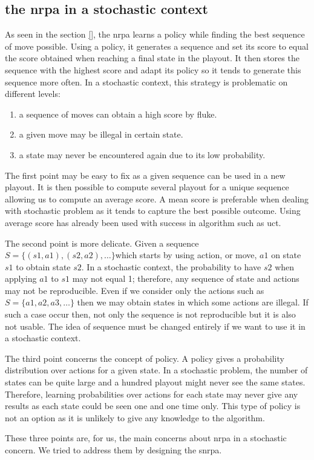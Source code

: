 \subsection{the \gls{nrpa} in a stochastic context}
\label{sub:snrpa_design_process}

As seen in the section  \ref{}, the \gls{nrpa} learns a policy while finding the best sequence of move possible.
Using a policy, it generates a sequence and set its score to equal the score obtained when reaching a final state in the playout.
It then stores the sequence with the highest score and adapt its policy so it tends to generate this sequence more often.
In a stochastic context, this strategy is problematic on different levels:

\begin{enumerate}
    \item a sequence of moves can obtain a high score by fluke.
    \item a given move may be illegal in certain state.
    \item a state may never be encountered again due to its low probability.
\end{enumerate}

The first point may be easy to fix as a given sequence can be used in a new playout.
It is then possible to compute several playout for a unique sequence allowing us to compute an average score.
A mean score is preferable when dealing with stochastic problem as it tends to capture the best possible outcome.
Using average score has already been used with success in algorithm such as \gls{uct}\cite{uct}.

The second point is more delicate.
Given a sequence \(S=\{(s1, a1), (s2, a2), \dots \} \)which starts by using action, or move, \(a1\) on state \(s1\) to obtain state \(s2\).
In a stochastic context, the probability to have \(s2\) when applying \(a1\) to \(s1\) may not equal 1; therefore, any sequence of state and actions may not be reproducible.
Even if we consider only the actions such as \(S=\{a1, a2, a3, \dots\}\) then we may obtain states in which some actions are illegal.
If such a case occur then, not only the sequence is not reproducible but it is also not usable.
The idea of sequence must be changed entirely if we want to use it in a stochastic context.

The third point concerns the concept of policy.
A policy gives a probability distribution over actions for a given state.
In a stochastic problem, the number of states can be quite large and a hundred playout might never see the same states.
Therefore, learning probabilities over actions for each state may never give any results as each state could be seen one and one time only.
This type of policy is not an option as it is unlikely to give any knowledge to the algorithm.

These three points are, for us, the main concerns about \gls{nrpa} in a stochastic concern.
We tried to address them by designing the \gls{snrpa}.
